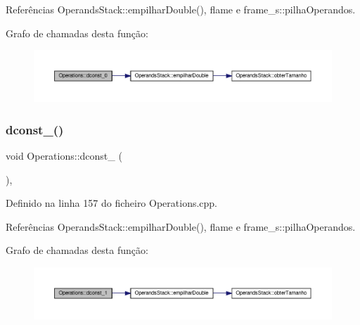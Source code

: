 Referências Operands\+Stack\+::empilhar\+Double(), flame e frame\+\_\+s\+::pilha\+Operandos.

Grafo de chamadas desta função\+:
\nopagebreak
\begin{figure}[H]
\begin{center}
\leavevmode
\includegraphics[width=350pt]{classOperations_abd7f711342c43f7fa4e93b41931e6c86_cgraph}
\end{center}
\end{figure}
\mbox{\label{classOperations_a1a704891f81e3b532bf0eaad94429773}} 
\subsubsection{\texorpdfstring{dconst\+\_()}{dconst\_1()}}
{\footnotesize\ttfamily void Operations\+::dconst\+\_ (\begin{DoxyParamCaption}{ }\end{DoxyParamCaption})\hspace{0.3cm}{\ttfamily [static]}, {\ttfamily [private]}}



Definido na linha 157 do ficheiro Operations.\+cpp.



Referências Operands\+Stack\+::empilhar\+Double(), flame e frame\+\_\+s\+::pilha\+Operandos.

Grafo de chamadas desta função\+:
\nopagebreak
\begin{figure}[H]
\begin{center}
\leavevmode
\includegraphics[width=350pt]{classOperations_a1a704891f81e3b532bf0eaad94429773_cgraph}
\end{center}
\end{figure}
\mbox{\label{classOperations_a3c323c9f0d40e68bf54cd449a55618c3}} 
